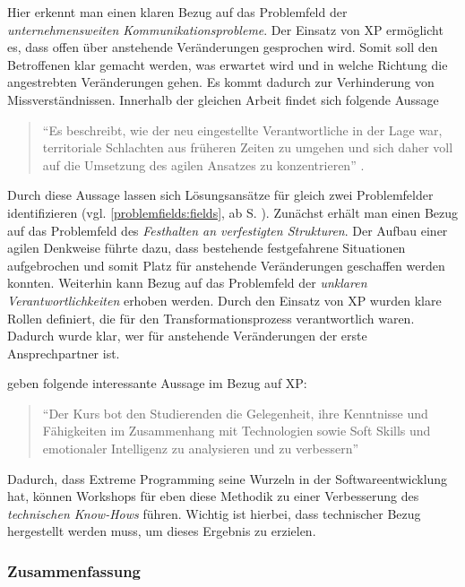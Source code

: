 Hier erkennt man einen klaren Bezug auf das Problemfeld der \textit{unternehmensweiten Kommunikationsprobleme}. Der Einsatz von XP ermöglicht es, dass offen über anstehende Veränderungen gesprochen wird. Somit soll den Betroffenen klar gemacht werden, was erwartet wird und in welche Richtung die angestrebten Veränderungen gehen. Es kommt dadurch zur Verhinderung von Missverständnissen. Innerhalb der gleichen Arbeit findet sich folgende Aussage

\begin{quote}
	``Es beschreibt, wie der neu eingestellte Verantwortliche in der Lage war, territoriale Schlachten aus früheren Zeiten zu umgehen und sich daher voll auf die Umsetzung des agilen Ansatzes zu konzentrieren'' \cite[S. 15]{dikert_challenges_2016}.
\end{quote}

Durch diese Aussage lassen sich Lösungsansätze für gleich zwei Problemfelder identifizieren (vgl. \ref{problemfields:fields}, ab S. \pageref{problemfields:fields}). Zunächst erhält man einen Bezug auf das Problemfeld des \textit{Festhalten an verfestigten Strukturen}. Der Aufbau einer agilen Denkweise führte dazu, dass bestehende festgefahrene Situationen aufgebrochen und somit Platz für anstehende Veränderungen geschaffen werden konnten. Weiterhin kann Bezug auf das Problemfeld der \textit{unklaren Verantwortlichkeiten} erhoben werden. Durch den Einsatz von XP wurden klare Rollen definiert, die für den Transformationsprozess verantwortlich waren. Dadurch wurde klar, wer für anstehende Veränderungen der erste Ansprechpartner ist.

 geben folgende interessante Aussage im Bezug auf XP:

\begin{quote}
	``Der Kurs bot den Studierenden die Gelegenheit, ihre Kenntnisse und Fähigkeiten im Zusammenhang mit Technologien sowie Soft Skills und emotionaler Intelligenz zu analysieren und zu verbessern'' \cite[S. 6]{shahzad_training_nodate}
\end{quote}

Dadurch, dass Extreme Programming seine Wurzeln in der Softwareentwicklung hat, können Workshops für eben diese Methodik zu einer Verbesserung des \textit{technischen Know-Hows} führen. Wichtig ist hierbei, dass technischer Bezug hergestellt werden muss, um dieses Ergebnis zu erzielen.


\subsubsection{Zusammenfassung}

